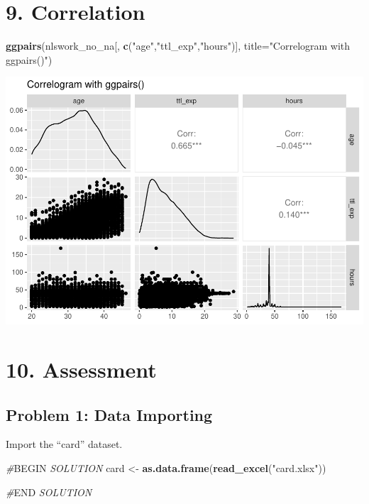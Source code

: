 \documentclass[
]{article}
\newenvironment{Shaded}{\begin{snugshade}}{\end{snugshade}}
\newcommand{\AttributeTok}[1]{\textcolor[rgb]{0.13,0.29,0.53}{#1}}
\newcommand{\CommentTok}[1]{\textcolor[rgb]{0.56,0.35,0.01}{\textit{#1}}}
\newcommand{\FunctionTok}[1]{\textcolor[rgb]{0.13,0.29,0.53}{\textbf{#1}}}
\newcommand{\NormalTok}[1]{#1}
\newcommand{\OtherTok}[1]{\textcolor[rgb]{0.56,0.35,0.01}{#1}}
\newcommand{\RegionMarkerTok}[1]{#1}
\newcommand{\StringTok}[1]{\textcolor[rgb]{0.31,0.60,0.02}{#1}}
\begin{document}
\hypertarget{correlation}{%
\section{9. Correlation}\label{correlation}}

\begin{Shaded}
\begin{Highlighting}[]
\FunctionTok{ggpairs}\NormalTok{(nlswork\_no\_na[, }\FunctionTok{c}\NormalTok{(}\StringTok{"age"}\NormalTok{,}\StringTok{"ttl\_exp"}\NormalTok{,}\StringTok{"hours"}\NormalTok{)], }\AttributeTok{title=}\StringTok{"Correlogram with ggpairs()"}\NormalTok{)}
\end{Highlighting}
\end{Shaded}

\includegraphics{RIntro_files/figure-latex/unnamed-chunk-28-1.pdf}

\hypertarget{assessment}{%
\section{10. Assessment}\label{assessment}}

\hypertarget{problem-1-data-importing}{%
\subsection{Problem 1: Data Importing}\label{problem-1-data-importing}}

Import the ``card'' dataset.

\begin{Shaded}
\begin{Highlighting}[]
\CommentTok{\#}\RegionMarkerTok{BEGIN}\CommentTok{ SOLUTION}
\NormalTok{card }\OtherTok{\textless{}{-}} \FunctionTok{as.data.frame}\NormalTok{(}\FunctionTok{read\_excel}\NormalTok{(}\StringTok{"card.xlsx"}\NormalTok{))}

\CommentTok{\#}\RegionMarkerTok{END}\CommentTok{ SOLUTION}
\end{Highlighting}
\end{Shaded}
\end{document}
